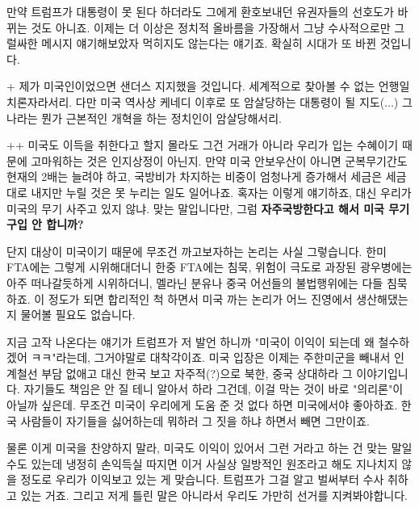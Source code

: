 만약 트럼프가 대통령이 못 된다 하더라도 그에게 환호보내던 유권자들의 선호도가 바뀌는 것도 아니죠.
이제는 더 이상은 정치적 올바름을 가장해서 그냥 수사적으로만 그럴싸한 메시지 얘기해보았자 먹히지도 않는다는 얘기죠.
확실히 시대가 또 바뀐 것입니다.
\vspace{5mm}

+
제가 미국인이었으면 샌더스 지지했을 것입니다. 세계적으로 찾아볼 수 없는 언행일치론자라서리.
다만 미국 역사상 케네디 이후로 또 암살당하는 대통령이 될 지도(...) 그 나라는 뭔가 근본적인 개혁을 하는 정치인이 암살당해서리.
\vspace{5mm}

++
미국도 이득을 취한다고 할지 몰라도 그건 거래가 아니라 우리가 입는 수혜이기 때문에 고마워하는 것은 인지상정이 아닌지.
만약 미국 안보우산이 아니면 군복무기간도 현재의 2배는 늘려야 하고, 국방비가 차지하는 비중이 엄청나게 증가해서
세금은 세금대로 내지만 누릴 것은 못 누리는 일도 일어나죠.
혹자는 이렇게 얘기하죠, 대신 우리가 미국의 무기 사주고 있지 않냐.
맞는 말입니다만, 그럼 \textbf{자주국방한다고 해서 미국 무기 구입 안 합니까?}
\vspace{5mm}

단지 대상이 미국이기 때문에 무조건 까고보자하는 논리는 사실 그렇습니다.
한미 FTA에는 그렇게 시위해대더니 한중 FTA에는 침묵,
위험이 극도로 과장된 광우병에는 아주 떠나갈듯하게 시위하더니, 멜라닌 분유나 중국 어선들의 불법행위에는 다들 침묵하죠.
이 정도가 되면 합리적인 척 하면서 미국 까는 논리가 어느 진영에서 생산해댔는지 물어볼 필요도 없습니다.
\vspace{5mm}

지금 고작 나온다는 얘기가 트럼프가 저 발언 하니까 "미국이 이익이 되는데 왜 철수하겠어 ㅋㅋ"라는데, 그거야말로 대착각이죠.
미국 입장은 이제는 주한미군을 빼내서 인계철선 부담 없애고 대신 한국 보고 자주적(?)으로 북한, 중국 상대하라 그 이야기입니다.
자기들도 책임은 안 질 테니 알아서 하라 그건데, 이걸 막는 것이 바로 "의리론"이 아닐까 싶은데.
무조건 미국이 우리에게 도움 준 것 없다 하면 미국에서야 좋아하죠.
한국 사람들이 자기들을 싫어하는데 뭐하러 그 짓을 하냐 하면서 빼면 그만이죠.
\vspace{5mm}

물론 이게 미국을 찬양하지 말라, 미국도 이익이 있어서 그런 거라고 하는 건 맞는 말일 수도 있는데
냉정히 손익득실 따지면 이거 사실상 일방적인 원조라고 해도 지나치지 않을 정도로 우리가 이익보고 있는 게 맞습니다.
트럼프가 그걸 알고 벌써부터 수사 취하고 있는 거죠. 그리고 저게 틀린 말은 아니라서 우리도 가만히 선거를 지켜봐야합니다.
\vspace{5mm}

